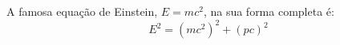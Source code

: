\documentclass[12pt,oneside,a4paper]{article}
\begin{document}
	A famosa equaç\~ao de Einstein, $E=m c^2$, 
	na sua forma completa \'e:
	\begin{equation}
		E^2 = (m c^2)^2 + (p c)^2
	\end{equation}
\end{document}
